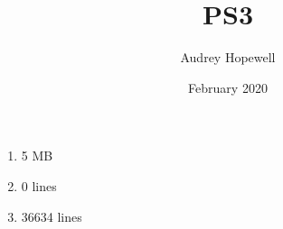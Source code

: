 \documentclass{article}
\title{PS3}
\author{Audrey Hopewell}
\date{February 2020}
\begin{document}
\maketitle

\begin{enumerate}
    \item 5 MB
    \item 0 lines
    \item 36634 lines
\end{enumerate}
\end{document}
